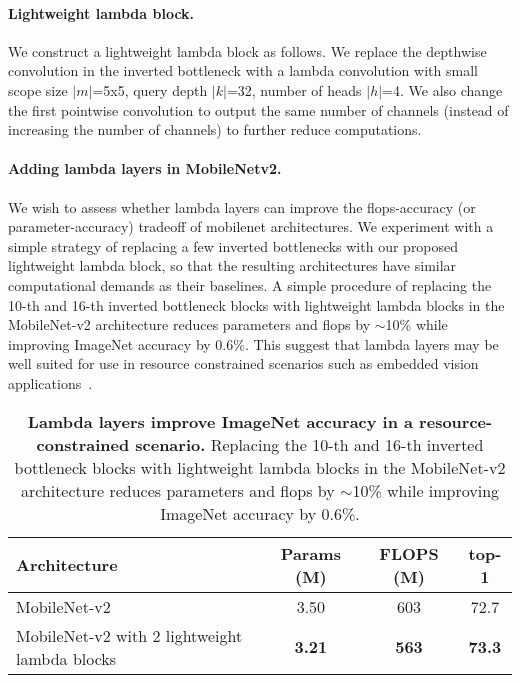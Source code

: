 \documentclass{article} \usepackage{iclr2021_conference,times}
\begin{document}
\paragraph{Lightweight lambda block.}
We construct a lightweight lambda block as follows.
We replace the depthwise convolution in the inverted bottleneck with a lambda convolution with small scope size $|m|$=5x5, query depth $|k|$=32, number of heads $|h|$=4.
We also change the first pointwise convolution to output the same number of channels (instead of increasing the number of channels) to further reduce computations.

\paragraph{Adding lambda layers in MobileNetv2.}
We wish to assess whether lambda layers can improve the flops-accuracy (or parameter-accuracy) tradeoff of mobilenet architectures.
We experiment with a simple strategy of replacing a few inverted bottlenecks with our proposed lightweight lambda block, so that the resulting architectures have similar computational demands as their baselines.
A simple procedure of replacing the 10-th and 16-th inverted bottleneck blocks with lightweight lambda blocks in the MobileNet-v2 architecture reduces parameters and flops by $\sim$10\% while improving ImageNet accuracy by 0.6\%.
This suggest that lambda layers may be well suited for use in resource constrained scenarios such as embedded vision applications~\citep{howard2017mobilenets,sandler2018mobilenetv2,howard2019searching}.

\begin{table}[h!]
  \begin{center}
  \small
  \begin{tabular}{lccc}
    \toprule
    Architecture & Params (M) & FLOPS (M) & top-1 \\
    \midrule
    MobileNet-v2 & 3.50 & 603 & 72.7 \\
    MobileNet-v2 with 2 lightweight lambda blocks & \textbf{3.21} & \textbf{563} & \textbf{73.3} \\
    \bottomrule
  \end{tabular}
  \caption{
  \textbf{Lambda layers improve ImageNet accuracy in a resource-constrained scenario.}
  Replacing the 10-th and 16-th inverted bottleneck blocks with lightweight lambda blocks in the MobileNet-v2 architecture reduces parameters and flops by $\sim$10\% while improving ImageNet accuracy by 0.6\%.
  }
  \label{tab:mobilenets}
  \end{center}
\end{table} \newpage
\end{document}
